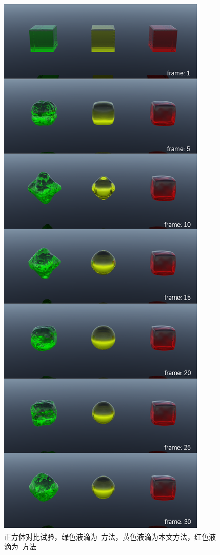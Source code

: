 \begin{figure}[htbp]
    \centering
    \includegraphics[scale=0.95]{./images/CompareTest.png}
    \caption[对比试验]{正方体对比试验，绿色液滴为~\cite{Zorrilla2020AcceleratingST}方法，黄色液滴为本文方法，红色液滴为~\cite{He2014}方法}
    \label{fig: Cube compare experiment}
\end{figure}
